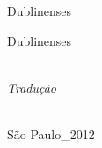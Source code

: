 
{\centering\vspace*{12em}\thispagestyle{empty}
{\huge Dublinenses}\par}

\cleardoublepage

{\centering\vspace*{12em}\thispagestyle{empty}
{\huge Dublinenses}\\\bigskip
{\Large{}}

\vspace*{14em}
{}\\
{\small\textit{Tradução}}\medskip

\vfill

\logoum\\
{\normalsize São Paulo\_2012}\par}

\clearpage

